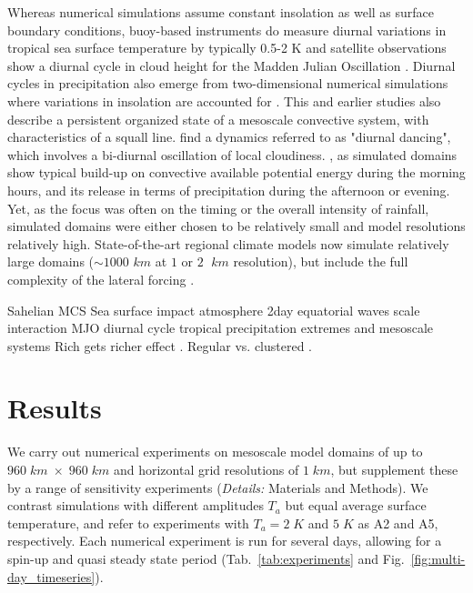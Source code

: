 \documentclass[draft,linenumbers]{agujournal2019}
\begin{document}
Whereas numerical simulations assume constant insolation as well as surface boundary conditions, buoy-based instruments do measure diurnal variations in tropical sea surface temperature by typically 0.5-2 K \cite{weller1996surface,johnson1999trimodal} and satellite observations show a diurnal cycle in cloud height for the Madden Julian Oscillation \cite{suzuki2009diurnal,tian2006modulation}.
Diurnal cycles in precipitation also emerge from two-dimensional numerical simulations where variations in insolation are accounted for \cite{liu1998numerical}. 
This and earlier studies\cite{chen1997diurnal} also describe a persistent organized state of a mesoscale convective system, with characteristics of a squall line.
\cite{chen1997diurnal} find a dynamics referred to as "diurnal dancing", which involves a bi-diurnal oscillation of local cloudiness.
\cite{guichard2004modelling,brown2002large,petch2002impact,schlemmer2011diurnal,moseley2016,haerter2018intensified}, as simulated domains show typical build-up on convective available potential energy during the morning hours, and its release in terms of precipitation during the afternoon or evening.
Yet, as the focus was often on the timing or the overall intensity of rainfall, simulated domains were either chosen to be relatively small and model resolutions relatively high. 
State-of-the-art regional climate models now simulate relatively large domains ($\sim 1000$ $km$ at $1$ or $2$ $\;km$ resolution), but include the full complexity of the lateral forcing \cite{ban2015heavy}. 

Sahelian MCS \cite{mathon2001life}
Sea surface impact atmosphere \cite{kawai2007diurnal}
2day equatorial waves \cite{haertel2004dynamics}
scale interaction MJO diurnal cycle \cite{peatman2014propagation}
tropical precipitation extremes and mesoscale systems \cite{rossow2013tropical}
Rich gets richer effect \cite{chou2009evaluating}.
Regular vs. clustered \cite{tompkins2017organization}.


\section{Results}\label{sec:results}
\noindent
We carry out numerical experiments on mesoscale model domains of up to $960\;km\;\times\;960\;km$ and horizontal grid resolutions of $1\;km$, but supplement these by a range of sensitivity experiments ({\it Details:}  Materials and Methods).
We contrast simulations with different amplitudes $T_a$ but equal average surface temperature, and refer to experiments with $T_a=2\;K$ and $5\;K$ as A2 and A5, respectively.
Each numerical experiment is run for several days, allowing for a spin-up and quasi steady state period (Tab.~\ref{tab:experiments} and Fig.~\ref{fig:multi-day_timeseries}). 
\end{document}
